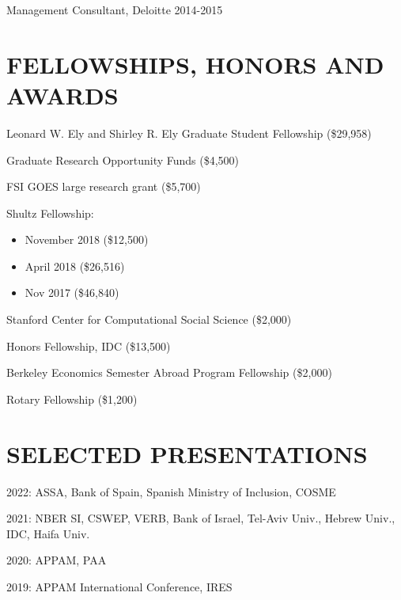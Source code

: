 \documentclass[margin]{res} %
\begin{document}
\begin{resume}
 Management Consultant, Deloitte \hfill 2014-2015 


\section{FELLOWSHIPS, HONORS AND AWARDS}

		 Leonard W. Ely and Shirley R. Ely Graduate Student Fellowship (\$29,958)

     Graduate Research Opportunity Funds (\$4,500)

     FSI GOES large research grant (\$5,700)

     Shultz Fellowship:
     \begin{itemize}
     	\item November 2018 (\$12,500)
     	\item April 2018 (\$26,516)
     	\item Nov 2017 (\$46,840)
     \end{itemize}

		 Stanford Center for Computational Social Science (\$2,000) 

		 Honors Fellowship, IDC (\$13,500) 

		 Berkeley Economics Semester Abroad Program Fellowship (\$2,000) 

		 Rotary Fellowship (\$1,200) 


 
\section{SELECTED PRESENTATIONS} 
\vspace{2em}

 2022: ASSA, Bank of Spain, Spanish Ministry of Inclusion, COSME

 2021: NBER SI, CSWEP, VERB, Bank of Israel, Tel-Aviv Univ., Hebrew Univ., IDC, Haifa Univ.

 2020: APPAM, PAA

 2019: APPAM International Conference, IRES


\end{resume}
\end{document}
